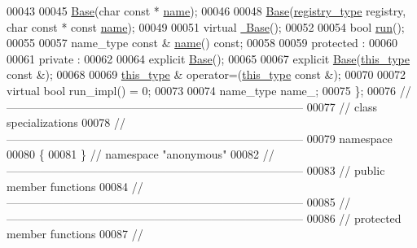 \begin{DoxyCode}
00043 
00045     \hyperlink{classhryky_1_1testing_1_1unit_1_1_base}{Base}(\textcolor{keywordtype}{char} \textcolor{keyword}{const} * \hyperlink{classhryky_1_1testing_1_1unit_1_1_base_ae8fab2ba0d99923c9600ee6ba8460da1}{name});
00046 
00048     \hyperlink{classhryky_1_1testing_1_1unit_1_1_base}{Base}(\hyperlink{classhryky_1_1testing_1_1_registry}{registry_type} registry, \textcolor{keywordtype}{char} \textcolor{keyword}{const} * \textcolor{keyword}{const} \hyperlink{classhryky_1_1testing_1_1unit_1_1_base_ae8fab2ba0d99923c9600ee6ba8460da1}{name});
00049 
00051     \textcolor{keyword}{virtual} \hyperlink{classhryky_1_1testing_1_1unit_1_1_base_a722da881b6c70cfcbde9243abcfbf334}{~Base}();
00052 
00054     \textcolor{keywordtype}{bool} \hyperlink{classhryky_1_1testing_1_1unit_1_1_base_a5f4df2667df36f034b69d2be14b7c1a5}{run}();
00055 
00057     name\_type \textcolor{keyword}{const} & \hyperlink{classhryky_1_1testing_1_1unit_1_1_base_ae8fab2ba0d99923c9600ee6ba8460da1}{name}() \textcolor{keyword}{const};
00058 
00059 \textcolor{keyword}{protected} :
00060 
00061 \textcolor{keyword}{private} :
00062 
00064     \textcolor{keyword}{explicit} \hyperlink{classhryky_1_1testing_1_1unit_1_1_base}{Base}();
00065 
00067     \textcolor{keyword}{explicit} \hyperlink{classhryky_1_1testing_1_1unit_1_1_base}{Base}(\hyperlink{classhryky_1_1testing_1_1unit_1_1_base}{this_type} \textcolor{keyword}{const} &);
00068 
00069     \hyperlink{classhryky_1_1testing_1_1unit_1_1_base}{this_type} & operator=(\hyperlink{classhryky_1_1testing_1_1unit_1_1_base}{this_type} \textcolor{keyword}{const} &);
00070 
00072     \textcolor{keyword}{virtual} \textcolor{keywordtype}{bool} run\_impl() = 0;
00073     
00074     name\_type   name\_;
00075 \};
00076 \textcolor{comment}{//
      ------------------------------------------------------------------------------}
00077 \textcolor{comment}{// class specializations}
00078 \textcolor{comment}{//
      ------------------------------------------------------------------------------}
00079 \textcolor{keyword}{namespace}
00080 \{
00081 \} \textcolor{comment}{// namespace "anonymous"}
00082 \textcolor{comment}{//
      ------------------------------------------------------------------------------}
00083 \textcolor{comment}{// public member functions}
00084 \textcolor{comment}{//
      ------------------------------------------------------------------------------}
00085 \textcolor{comment}{//
      ------------------------------------------------------------------------------}
00086 \textcolor{comment}{// protected member functions}
00087 \textcolor{comment}{//
}
\end{DoxyCode}
